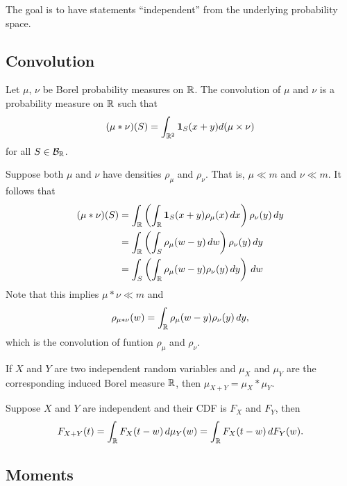 \documentclass[a4paper]{article}
\begin{document}
\begin{remark}
  The goal is to have statements ``independent'' from the underlying
  probability space.
\end{remark}

\subsection{Convolution}

\begin{defi}[convolution]
  Let $\mu$, $\nu$ be Borel probability measures on $\mathbb{R}$.
  The convolution of $\mu$ and $\nu$ is a probability measure
  on $\mathbb{R}$ such that
  \[
    (\mu * \nu) (S) = \int_{\mathbb{R}^2} \operatorname{\mathbf{1}}_S (x + y) d (\mu \times \nu)
  \]
  for all $S \in \mathcal{B}_{\mathbb{R}}$.
\end{defi}

\begin{remark}
  Suppose both $\mu$ and $\nu$ have densities $\rho_\mu$ and
  $\rho_\nu$. That is,
  $\mu \ll m$ and $\nu \ll m$. It follows that
  \begin{align*}
    (\mu * \nu) (S)
     & = \int_{\mathbb{R}} \left( \int_{\mathbb{R}} \operatorname{\mathbf{1}}_S (x + y) \rho_\mu (x) \, d x \right)
    \rho_\nu (y) \, d y                                                          \\
     & = \int_{\mathbb{R}} \left( \int_S \rho_\mu (w - y) \, d w \right) \rho_\nu (y) \, d y \\
     & = \int_S \left( \int_{\mathbb{R}} \rho_\mu (w - y) \rho_\nu (y) \, d y \right)
    \, d w
  \end{align*}
  Note that this implies $\mu * \nu \ll m$ and
  \[
    \rho_{\mu * \nu} (w) = \int_{\mathbb{R}} \rho_\mu (w - y) \rho_\nu (y) \, d y,
  \]
  which is the convolution of funtion $\rho_\mu$ and $\rho_\nu$.
\end{remark}

\begin{remark}
  If $X$ and $Y$ are two independent random variables and
  $\mu_X$ and $\mu_Y$ are the corresponding induced Borel measure $\mathbb{R}$,
  then $\mu_{X + Y} = \mu_X * \mu_Y$.
\end{remark}

\begin{remark}
  Suppose $X$ and $Y$ are independent and their CDF is $F_X$ and $F_Y$,
  then
  \[
    F_{X + Y} (t) = \int_{\mathbb{R}} F_X (t - w) \, d \mu_Y (w)
    = \int_{\mathbb{R}} F_X (t - w) \, d F_Y (w).
  \]
\end{remark}

\subsection{Moments}
\end{document}
